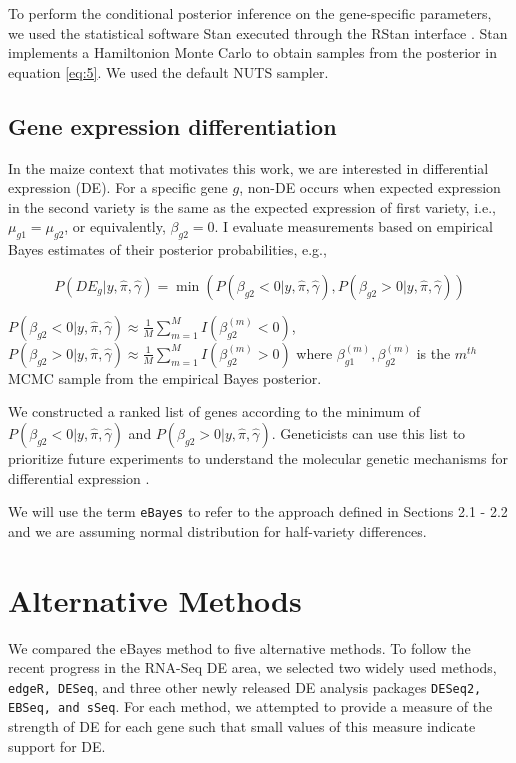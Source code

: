 To perform the conditional posterior inference on the gene-specific parameters, we used the statistical software Stan \citep{stan2014stan} executed through the RStan interface \citep{team2016rstan}. Stan implements a Hamiltonion Monte Carlo \citep{neal2011mcmc} to obtain samples from the posterior in equation \ref{eq:5}. We used the default NUTS sampler\citep{annis2017bayesian}.


\subsection{Gene expression differentiation}

In the maize context that motivates this work, we are interested in differential expression (DE). For a specific gene $g$, non-DE occurs when expected expression in the second variety is the same as the expected expression of first variety, i.e., $\mu_{g1} = \mu_{g2}$, or equivalently, $\beta_{g2}=0$.  I evaluate measurements based on empirical Bayes estimates of their posterior probabilities, e.g., 

\begin{equation}
\label{eq:6}
P(DE_g | y, \hat{\pi}, \hat{\gamma}) =\min( P(\beta_{g2}< 0 | y, \hat{\pi}, \hat{\gamma}),  P(\beta_{g2}> 0 | y, \hat{\pi}, \hat{\gamma}))
\end{equation}

$P(\beta_{g2}< 0 | y, \hat{\pi}, \hat{\gamma}) \approx \frac{1}{M} \sum_{m=1}^M I(\beta_{g2} ^ {(m)} < 0)$, $P(\beta_{g2}> 0 | y, \hat{\pi}, \hat{\gamma}) \approx \frac{1}{M} \sum_{m=1}^M I(\beta_{g2} ^ {(m)} > 0) $
where $\beta_{g1}^{(m)}, \beta_{g2}^{(m)}$ is the $m^{th}$ MCMC sample from the empirical Bayes posterior.


We constructed a ranked list of genes according to the minimum of $P(\beta_{g2}< 0 | y, \hat{\pi}, \hat{\gamma})$ and $P(\beta_{g2}> 0 | y, \hat{\pi}, \hat{\gamma})$. Geneticists can use this list to prioritize future experiments to understand the molecular genetic mechanisms for differential expression \citep{niemi2015empirical}. 

We will use the term {\tt eBayes} to refer to the approach defined in Sections 2.1 - 2.2 and we are assuming normal distribution for half-variety differences.

\section{Alternative Methods}

We compared the eBayes method to five alternative methods. To follow the recent progress in the RNA-Seq DE area, we selected two widely used methods, {\tt edgeR, DESeq}, and three other newly released DE analysis packages {\tt DESeq2, EBSeq, and sSeq}. For each method, we attempted to provide a measure of the strength of DE for each gene such that small values of this measure indicate support for DE. 

